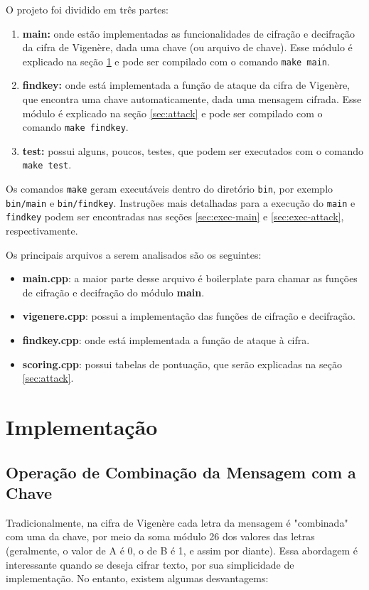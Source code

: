 \documentclass[conference]{IEEEtran}
\begin{document}
O projeto foi dividido em três partes:

\begin{enumerate}
    \item \textbf{main:} onde estão implementadas as funcionalidades de cifração
        e decifração da cifra de Vigenère, dada uma chave (ou arquivo de chave).
        Esse módulo é explicado na seção \ref{sec:implementation} e pode ser
        compilado com o comando \verb|make main|.
    \item \textbf{findkey:} onde está implementada a função de ataque da
        cifra de Vigenère, que encontra uma chave automaticamente, dada uma
        mensagem cifrada. Esse módulo é explicado na seção \ref{sec:attack} e
        pode ser compilado com o comando \verb|make findkey|. 
    \item \textbf{test:} possui alguns, poucos, testes, que podem ser executados
        com o comando \verb|make test|.
\end{enumerate}

Os comandos \verb|make| geram executáveis dentro do diretório \verb|bin|, por
exemplo \verb|bin/main| e \verb|bin/findkey|. Instruções mais detalhadas para a
execução do \verb|main| e \verb|findkey| podem ser encontradas nas seções
\ref{sec:exec-main} e \ref{sec:exec-attack}, respectivamente.  

Os principais arquivos a serem analisados são os seguintes:
\begin{itemize}
    \item \textbf{main.cpp}: a maior parte desse arquivo é boilerplate para
        chamar as funções de cifração e decifração do módulo \textbf{main}.
    \item \textbf{vigenere.cpp}: possui a implementação das funções de cifração
        e decifração.
    \item \textbf{findkey.cpp}: onde está implementada a função de ataque à
        cifra.
    \item \textbf{scoring.cpp}: possui tabelas de pontuação, que serão
        explicadas na seção \ref{sec:attack}.
\end{itemize}


\section{Implementação} %
\label{sec:implementation}

\subsection{Operação de Combinação da Mensagem com a Chave}
Tradicionalmente, na cifra de Vigenère cada letra da mensagem é "combinada" com
uma da chave, por meio da soma módulo 26 dos valores das letras (geralmente, o
valor de A é 0, o de B é 1, e assim por diante). Essa abordagem é interessante
quando se deseja cifrar texto, por sua simplicidade de implementação. No
entanto, existem algumas desvantagems:
\end{document}
